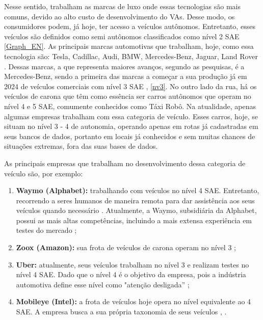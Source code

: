 Nesse sentido, trabalham as marcas de luxo onde essas tecnologias são mais comuns, devido ao alto custo de desenvolvimento do VAs. Desse modo, os consumidores podem, já hoje, ter acesso a veículos autônomos. Entretanto, esses veículos são definidos como semi autônomos classificados como nível 2 SAE \ref{Graph_EN}. As principais marcas automotivas que trabalham, hoje, como essa tecnologia são: Tesla, Cadillac, Audi, BMW, Mercedes-Benz, Jaguar, Land Rover \cite{caio}. 
Dessas marcas, a que representa maiores avanços, segundo as pesquisas, é a Mercedes-Benz, sendo a primeira das marcas a começar a sua produção já em 2024 de veículos comerciais com nível 3 SAE \cite{mercedes3}, \ref{nv3}.
No outro lado da rua, há os veículos de carona que têm como essência ser carros autônomos que operam no nível 4 e 5 SAE, comumente conhecidos como Táxi Robô. Na atualidade, apenas algumas empresas trabalham com essa categoria de veículo. Esses carros, hoje, se situam no nível 3 - 4 de autonomia, operando apenas em rotas já cadastradas em seus bancos de dados, portanto em locais já conhecidos e sem muitas chances de situações extremas, fora das suas bases de dados. 

As principais empresas que trabalham no desenvolvimento dessa categoria de veículo são, por exemplo:

\begin{enumerate}

   \item \textbf{Waymo (Alphabet):}
         trabalhando com veículos no nível 4 SAE. Entretanto, recorrendo a seres humanos de maneira remota para dar assistência aos seus veículos quando necessário \cite{waymo}. Atualmente, a Waymo, subsidiária da Alphabet, possui as mais altas competências, incluindo a mais extensa experiência em testes do mercado \cite{CAM};
   \item \textbf{Zoox (Amazon):}
         sua frota de veículos de carona operam no nível 3 \cite{zoox};
   \item \textbf{Uber:}
         atualmente, seus veículos trabalham no nível 3 e realizam testes no nível 4 SAE. Dado que o nível 4 é o objetivo da empresa, pois a indústria automotiva define esse nível como "atenção desligada” \cite{uber};
   \item \textbf{Mobileye (Intel):}
         a frota de veículos hoje opera no nível equivalente ao 4 SAE. A empresa busca a sua própria taxonomia de seus veículos \cite{mobileye}, \cite{mobileye1}.
\end{enumerate}

